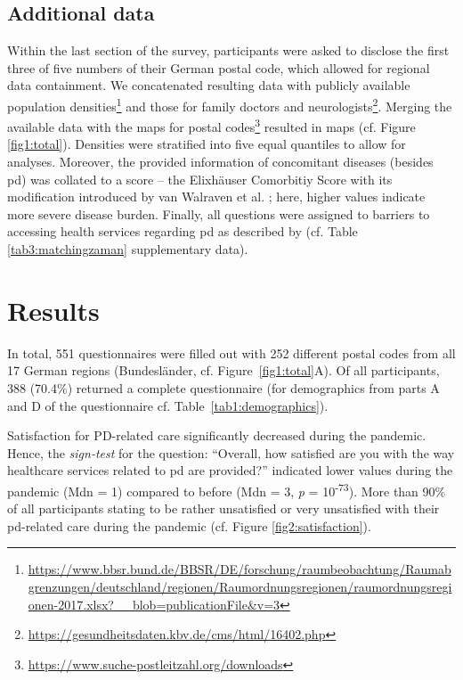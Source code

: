\documentclass{bmcart}
\begin{document}
\subsection*{Additional data}
Within the last section of the survey, participants were asked to disclose the first three of five numbers of their German postal code, which allowed for regional data containment. We concatenated resulting data with publicly available population densities\footnote{\url{https://www.bbsr.bund.de/BBSR/DE/forschung/raumbeobachtung/Raumabgrenzungen/deutschland/regionen/Raumordnungsregionen/raumordnungsregionen-2017.xlsx?\_\_blob=publicationFile\&v=3}} and those for family doctors and neurologists\footnote{\url{https://gesundheitsdaten.kbv.de/cms/html/16402.php}}. Merging the available data with the maps for postal codes\footnote{\url{https://www.suche-postleitzahl.org/downloads}} resulted in maps (cf. Figure \ref{fig1:total}). Densities were stratified into five equal quantiles to allow for analyses. Moreover, the provided information of concomitant diseases (besides \ac{pd}) was collated to a score -- the Elixhäuser Comorbitiy Score with its modification introduced by van Walraven et al. \cite{van2009modification}; here, higher values indicate more severe disease burden. Finally, all questions were assigned to barriers to accessing health services regarding \ac{pd} as described by \cite{zaman2021barriers} (cf. Table \ref{tab3:matchingzaman} supplementary data).

\newpage

\section*{Results}

In total, 551 questionnaires were filled out with 252 different postal codes from all 17 German regions (Bundesländer, cf. Figure~\ref{fig1:total}A). Of all participants, 388 (70.4$\%$) returned a complete questionnaire (for demographics from parts A and D of the questionnaire cf. Table~\ref{tab1:demographics}). 

Satisfaction for PD-related care significantly decreased during the pandemic. Hence, the \textit{sign-test} for the question: ``Overall, how satisfied are you with the way healthcare services related to \acl{pd} are provided?'' indicated lower values during the pandemic (Mdn = 1) compared to before (Mdn = 3, \textit{p} = 10\textsuperscript{-73}). More than 90\% of all participants stating to be rather unsatisfied or very unsatisfied with their \ac{pd}-related care during the pandemic (cf. Figure \ref{fig2:satisfaction}). 
\end{document}
